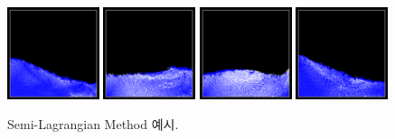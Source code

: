 \documentclass[11pt, A4]{article}
\begin{document}
\begin{figure}[h]
\includegraphics[width=0.24\textwidth]{realism-semilag-1}
\includegraphics[width=0.24\textwidth]{realism-semilag-2}
\includegraphics[width=0.24\textwidth]{realism-semilag-3}
\includegraphics[width=0.24\textwidth]{realism-semilag-4}
  \caption{Semi-Lagrangian Method 예시.}
  \label{realism-semilag}
\end{figure}
\end{document}

